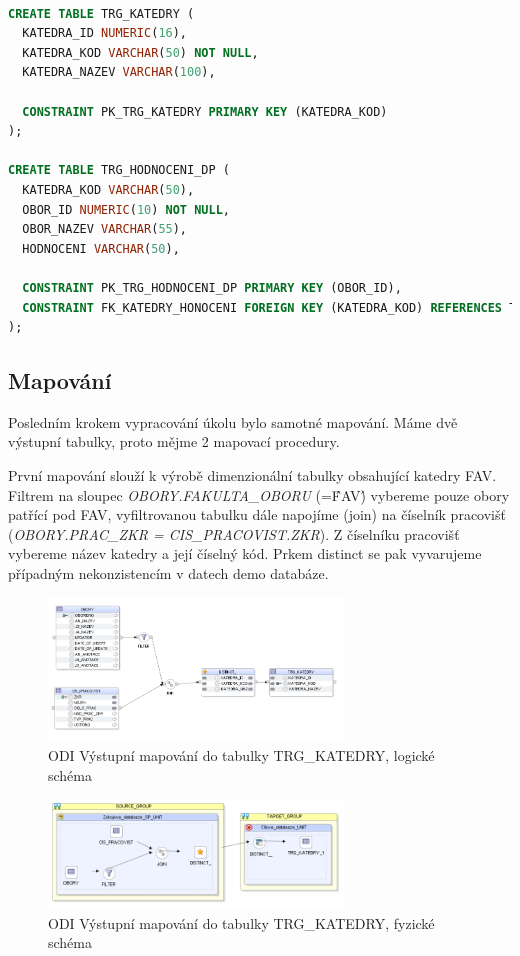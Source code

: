\begin{lstlisting}[language=sql]

CREATE TABLE TRG_KATEDRY (
  KATEDRA_ID NUMERIC(16),
  KATEDRA_KOD VARCHAR(50) NOT NULL,
  KATEDRA_NAZEV VARCHAR(100),

  CONSTRAINT PK_TRG_KATEDRY PRIMARY KEY (KATEDRA_KOD)
);

CREATE TABLE TRG_HODNOCENI_DP (
  KATEDRA_KOD VARCHAR(50),
  OBOR_ID NUMERIC(10) NOT NULL,
  OBOR_NAZEV VARCHAR(55),
  HODNOCENI VARCHAR(50),

  CONSTRAINT PK_TRG_HODNOCENI_DP PRIMARY KEY (OBOR_ID),
  CONSTRAINT FK_KATEDRY_HONOCENI FOREIGN KEY (KATEDRA_KOD) REFERENCES TRG_KATEDRY (KATEDRA_KOD)
);
\end{lstlisting}

\subsection{Mapování}

Posledním krokem vypracování úkolu bylo samotné mapování.
Máme dvě výstupní tabulky, proto mějme 2 mapovací procedury.

První mapování slouží k výrobě dimenzionální tabulky obsahující katedry FAV.
Filtrem na sloupec \textit{OBORY.FAKULTA\_OBORU} (=\'FAV\') vybereme pouze obory patřící pod FAV, vyfiltrovanou tabulku dále napojíme (join) na číselník pracovišť (\textit{OBORY.PRAC\_ZKR = CIS\_PRACOVIST.ZKR}).
Z číselníku pracovišť vybereme název katedry a její číselný kód.
Prkem distinct se pak vyvarujeme případným nekonzistencím v datech demo databáze.

\begin{figure}[htb]
    \centering
    \includegraphics[width=0.7\textwidth]{graphs/odi-mapping-trg-katedry.png}
    \caption{ODI Výstupní mapování do tabulky TRG\_KATEDRY, logické schéma}
    \label{fig:odi-mapping-trg-katedry}
\end{figure}
\FloatBarrier

\begin{figure}[htb]
    \centering
    \includegraphics[width=0.7\textwidth]{graphs/odi-mapping-trg-katedry-physical.png}
    \caption{ODI Výstupní mapování do tabulky TRG\_KATEDRY, fyzické schéma}
    \label{fig:odi-mapping-trg-katedry-physical}
\end{figure}
\FloatBarrier

